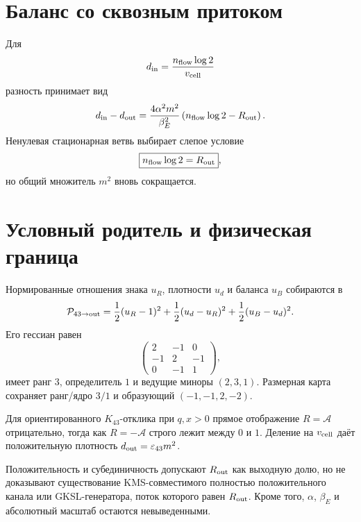 \section{Баланс со сквозным притоком}

Для
\begin{equation}
 d_{\rm in}=\frac{n_{\rm flow}\log2}{v_{\rm cell}}
\end{equation}
разность принимает вид
\begin{equation}
 d_{\rm in}-d_{\rm out}
 =\frac{4\alpha^2m^2}{\beta_E^2}
 \left(n_{\rm flow}\log2-R_{\rm out}\right).
 \label{eq:v10-k43-output-balance}
\end{equation}
Ненулевая стационарная ветвь выбирает слепое условие
\begin{equation}
 \boxed{n_{\rm flow}\log2=R_{\rm out}},
 \label{eq:v10-k43-output-blind-balance}
\end{equation}
но общий множитель $m^2$ вновь сокращается.

\section{Условный родитель и физическая граница}

Нормированные отношения знака $u_R$, плотности $u_d$ и баланса $u_B$
собираются в
\begin{equation}
 \mathcal P_{43\to{\rm out}}
 =\frac12(u_R-1)^2
 +\frac12(u_d-u_R)^2
 +\frac12(u_B-u_d)^2.
 \label{eq:v10-k43-output-parent}
\end{equation}
Его гессиан равен
\begin{equation}
 \begin{pmatrix}2&-1&0\\-1&2&-1\\0&-1&1\end{pmatrix},
\end{equation}
имеет ранг $3$, определитель $1$ и ведущие миноры $(2,3,1)$.
Размерная карта сохраняет ранг/ядро $3/1$ и образующий
$(-1,-1,2,-2)$.

\begin{theorem}
Для ориентированного $K_{43}$-отклика при $q,x>0$ прямое отображение
$R=\mathcal A$ отрицательно, тогда как $R=-\mathcal A$ строго лежит между
$0$ и $1$. Деление на $v_{\rm cell}$ даёт положительную плотность
$d_{\rm out}=\varepsilon_{43}m^2$.
\end{theorem}

\begin{nogocriterion}
Положительность и субединичность допускают $R_{\rm out}$ как выходную долю,
но не доказывают существование KMS-совместимого полностью положительного
канала или GKSL-генератора, поток которого равен $R_{\rm out}$. Кроме того,
$\alpha$, $\beta_E$ и абсолютный масштаб остаются невыведенными.
\end{nogocriterion}

